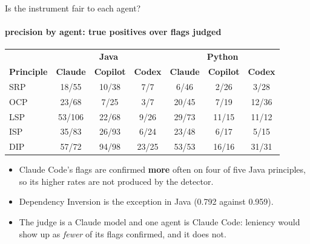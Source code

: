 \documentclass[11pt,aspectratio=169]{beamer}
\begin{document}
\begin{frame}{Is the instrument fair to each agent?}
\framesubtitle{precision by agent: true positives over flags judged}
\centering
\footnotesize
\begin{tabular}{@{}lccc|ccc@{}}
\toprule
& \multicolumn{3}{c|}{\textbf{Java}} & \multicolumn{3}{c}{\textbf{Python}} \\
\textbf{Principle} & \textbf{Claude} & \textbf{Copilot} & \textbf{Codex} & \textbf{Claude} & \textbf{Copilot} & \textbf{Codex} \\
\midrule
SRP & 18/55 & 10/38 & 7/7 & 6/46 & 2/26 & 3/28 \\
OCP & 23/68 & 7/25 & 3/7 & 20/45 & 7/19 & 12/36 \\
LSP & 53/106 & 22/68 & 9/26 & 29/73 & 11/15 & 11/12 \\
ISP & 35/83 & 26/93 & 6/24 & 23/48 & 6/17 & 5/15 \\
DIP & 57/72 & 94/98 & 23/25 & 53/53 & 16/16 & 31/31 \\
\bottomrule
\end{tabular}
\vspace{6pt}
\begin{itemize}\setlength{\itemsep}{3pt}\small
  \item Claude Code's flags are confirmed \textbf{more} often on four of five Java principles, so
        its higher rates are not produced by the detector.
  \item Dependency Inversion is the exception in Java (0.792 against 0.959).
  \item The judge is a Claude model and one agent is Claude Code: leniency would show up as
        \emph{fewer} of its flags confirmed, and it does not.
\end{itemize}
\end{frame}
\end{document}
